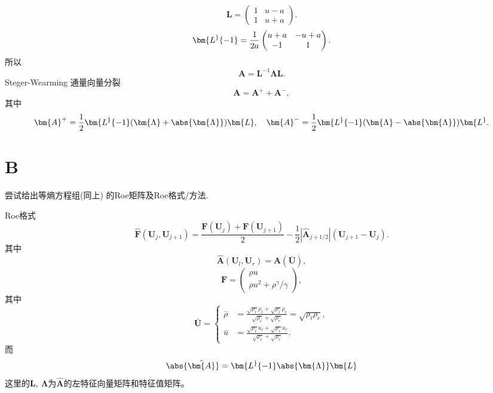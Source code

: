 \documentclass[12pt]{article}
\begin{document}
\begin{equation}
	\bm{L}= \begin{pmatrix}
		1 & u-a \\
		1 & u+a
	\end{pmatrix}.
\end{equation}
\begin{equation}
	\bm{L^}{-1} = \frac{1}{2a} \begin{pmatrix}
		u+a & -u+a \\
		-1  & 1
	\end{pmatrix}.
\end{equation}
所以
\begin{equation}
	\bm{A} = \bm{L}^{-1}\bm{\Lambda} \bm{L}.
\end{equation}
Steger-Wearming 通量向量分裂
\begin{equation}
	\bm{A} = \bm{A}^+ + \bm{A}^-,
\end{equation}
其中
\begin{equation}
	\bm{A}^+ = \frac{1}{2} \bm{L^}{-1}(\bm{\Lambda}+\abs{\bm{\Lambda}}) \bm{L },\quad \bm{A}^- = \frac{1}{2} \bm{L^}{-1}(\bm{\Lambda}-\abs{\bm{\Lambda}}) \bm{L^}.
\end{equation}



\section{B}

尝试给出等熵方程组(同上) 的Roe矩阵及Roe格式/方法.

Roe格式
\begin{equation}
	\hat{\bm{F}}\left(\bm{U}_{j}, \bm{U}_{j+1}\right)=\frac{\bm{F}\left(\bm{U}_{j}\right)+\bm{F}\left(\bm{U}_{j+1}\right)}{2}-\frac{1}{2}\left|\hat{\bm{A}}_{j+1 / 2}\right|\left(\bm{U}_{j+1}-\bm{U}_{j}\right).
\end{equation}
其中
\begin{equation}
	\hat{\bm{A}}(\bm{U}_l,\bm{U}_r) = \bm{A}(\bm{\bar{U}}),
\end{equation}
\begin{equation}
	\bm{F}=
	\begin{pmatrix}
		\rho u \\
		\rho u^2+\rho^\gamma/\gamma
	\end{pmatrix},
\end{equation}
其中
\begin{equation}
	\bm{\bar{U}}=
	\left\{
	\begin{aligned}
		\bar{\rho} & =\frac{\sqrt{\rho_{r}} \rho_{\ell}+\sqrt{\rho_{\ell}} \rho_{r}}{\sqrt{\rho_{\ell}}+\sqrt{\rho_{r}}}=\sqrt{\rho_{\ell} \rho_{r}}, \\
		\bar{u}    & =\frac{\sqrt{\rho_{\ell}} u_{\ell}+\sqrt{\rho_{r}} u_{r}}{\sqrt{\rho_{\ell}}+\sqrt{\rho_{r}}}.
	\end{aligned}\right.
\end{equation}
而
\begin{equation}
	\abs{\hat{\bm{A}}} = \bm{L^}{-1}\abs{\bm{\Lambda}} \bm{L}
\end{equation}
这里的$\bm{L},\ \bm{\Lambda}$为$\hat{\bm{A}}$的左特征向量矩阵和特征值矩阵。
\end{document}
